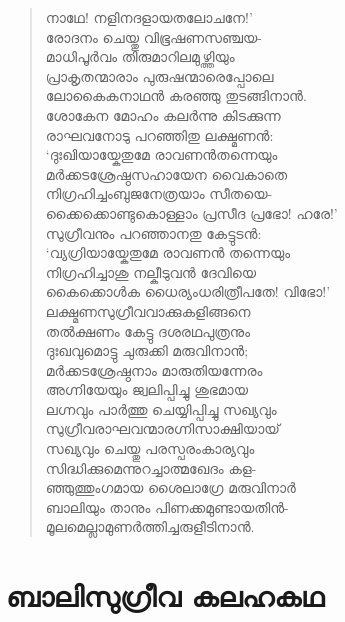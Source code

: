 \begin{verse}
നാഥേ! നളിനദളായതലോചനേ!’\\
രോദനം ചെയ്തു വിഭൂഷണസഞ്ചയ-\\
മാധിപൂര്‍വം തിരുമാറിലമുഴ്ത്തിയും\\
പ്രാകൃതന്മാരാം പുരുഷന്മാരെപ്പോലെ\\
ലോകൈകനാഥന്‍ കരഞ്ഞു തുടങ്ങിനാന്‍.\\
ശോകേന മോഹം കലര്‍ന്നു കിടക്കുന്ന\\
രാഘവനോടു പറഞ്ഞിതു ലക്ഷ്മണന്‍:\\
‘ദുഃഖിയായ്കേതുമേ രാവണന്‍തന്നെയും\\
മര്‍ക്കടശ്രേഷ്ഠസഹായേന വൈകാതെ\\
നിഗ്രഹിച്ചംബുജനേത്രയാം സീതയെ-\\
ക്കൈക്കൊണ്ടുകൊള്ളാം പ്രസീദ പ്രഭോ! ഹരേ!’\\
സുഗ്രീവനും പറഞ്ഞാനതു കേട്ടുടന്‍:\\
‘വ്യഗ്രിയായ്കേതുമേ രാവണന്‍ തന്നെയും\\
നിഗ്രഹിച്ചാശു നല്കീടുവന്‍ ദേവിയെ\\
കൈക്കൊള്‍ക ധൈര്യംധരിത്രീപതേ! വിഭോ!’\\
ലക്ഷ്മണസുഗ്രീവവാക്കുകളിങ്ങനെ\\
തല്‍ക്ഷണം കേട്ടു ദശരഥപുത്രനും\\
ദുഃഖവുമൊട്ടു ചുരുക്കി മരുവിനാന്‍;\\
മര്‍ക്കടശ്രേഷ്ഠനാം മാരുതിയന്നേരം\\
അഗ്നിയേയും ജ്വലിപ്പിച്ചു ശുഭമായ\\
ലഗ്നവും പാര്‍ത്തു ചെയ്യിപ്പിച്ചു സഖ്യവും\\
സുഗ്രീവരാഘവന്മാരഗ്നിസാക്ഷിയായ്\\
സഖ്യവും ചെയ്തു പരസ്പരംകാര്യവും\\
സിദ്ധിക്കുമെന്നുറച്ചാത്മഖേദം കള-\\
ഞ്ഞുത്തുംഗമായ ശൈലാഗ്രേ മരുവിനാര്‍\\
ബാലിയും താനും പിണക്കമുണ്ടായതിന്‍-\\
മൂലമെല്ലാമുണര്‍ത്തിച്ചരുളീടിനാന്‍.
\end{verse}


\section{ബാലിസുഗ്രീവ കലഹകഥ}

